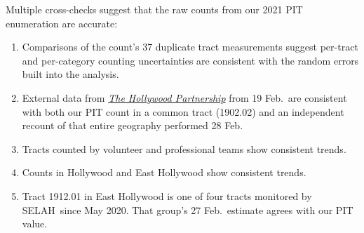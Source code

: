 \documentclass[11pt]{article}
\def\selah{SELAH}
\begin{document}
Multiple cross-checks suggest that the raw counts from our 2021 PIT enumeration are accurate:
\begin{enumerate}
	\item Comparisons of the count's 37 duplicate tract measurements suggest per-tract and per-category
		counting uncertainties are consistent with the random errors built into the analysis.
	\item External data from \href{https://hollywoodpartnership.com/}{\it The Hollywood Partnership} 
		from 19 Feb.\ are consistent with both our PIT count in a common tract (1902.02) and an independent 
		recount of that entire geography performed 28 Feb.%
	\item Tracts counted by volunteer and professional teams show consistent trends.
	\item Counts in Hollywood and East Hollywood show consistent trends.%
	\item Tract 1912.01 in East Hollywood is one of four tracts monitored by \selah\ since May 2020. That 
		group's 27 Feb.\ estimate agrees with our PIT value.%
\end{enumerate}
\end{document}
